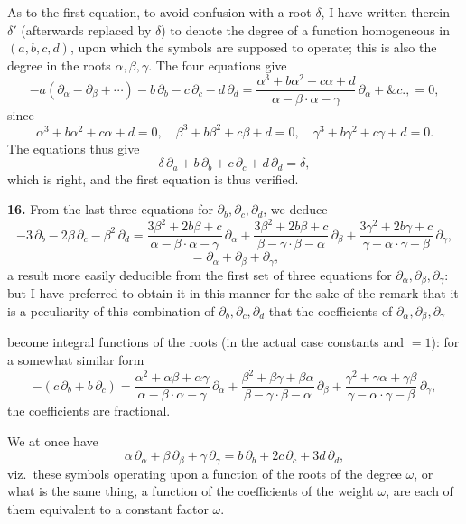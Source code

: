 \documentclass[11pt]{article}
\begin{document}
As to the first equation, to avoid confusion with a root $\delta$, I have written therein $\delta'$ (afterwards replaced by $\delta$) to denote the degree of a function homogeneous in $(a, b, c, d)$, upon which the symbols are supposed to operate; this is also the degree in the roots $\alpha, \beta, \gamma$. The four equations give
\[
-a(\partial_\alpha - \partial_\beta + \cdots) - b\,\partial_b - c\,\partial_c - d\,\partial_d = \frac{\alpha^3 + b\alpha^2 + c\alpha + d}{\alpha-\beta\cdot\alpha-\gamma}\,\partial_\alpha + \&c., = 0,
\]
since
\[
\alpha^3 + b\alpha^2 + c\alpha + d = 0,\quad \beta^3 + b\beta^2 + c\beta + d = 0,\quad \gamma^3 + b\gamma^2 + c\gamma + d = 0.
\]
The equations thus give
\[
\delta\,\partial_a + b\,\partial_b + c\,\partial_c + d\,\partial_d = \delta,
\]
which is right, and the first equation is thus verified.

\textbf{16.} From the last three equations for $\partial_b, \partial_c, \partial_d$, we deduce
\[
-3\,\partial_b - 2\beta\,\partial_c - \beta^2\,\partial_d = \frac{3\beta^2 + 2b\beta + c}{\alpha-\beta\cdot\alpha-\gamma}\,\partial_\alpha + \frac{3\beta^2 + 2b\beta + c}{\beta-\gamma\cdot\beta-\alpha}\,\partial_\beta + \frac{3\gamma^2 + 2b\gamma + c}{\gamma-\alpha\cdot\gamma-\beta}\,\partial_\gamma,
\]
\[
= \partial_\alpha + \partial_\beta + \partial_\gamma,
\]
a result more easily deducible from the first set of three equations for $\partial_\alpha, \partial_\beta, \partial_\gamma$: but I have preferred to obtain it in this manner for the sake of the remark that it is a peculiarity of this combination of $\partial_b, \partial_c, \partial_d$ that the coefficients of $\partial_\alpha, \partial_\beta, \partial_\gamma$

become integral functions of the roots (in the actual case constants and $= 1$): for a somewhat similar form
\[
-(c\,\partial_b + b\,\partial_c) = \frac{\alpha^2 + \alpha\beta + \alpha\gamma}{\alpha-\beta\cdot\alpha-\gamma}\,\partial_\alpha + \frac{\beta^2 + \beta\gamma + \beta\alpha}{\beta-\gamma\cdot\beta-\alpha}\,\partial_\beta + \frac{\gamma^2 + \gamma\alpha + \gamma\beta}{\gamma-\alpha\cdot\gamma-\beta}\,\partial_\gamma,
\]
the coefficients are fractional.

We at once have
\[
\alpha\,\partial_\alpha + \beta\,\partial_\beta + \gamma\,\partial_\gamma = b\,\partial_b + 2c\,\partial_c + 3d\,\partial_d,
\]
viz.\ these symbols operating upon a function of the roots of the degree $\omega$, or what is the same thing, a function of the coefficients of the weight $\omega$, are each of them equivalent to a constant factor $\omega$.
\end{document}
